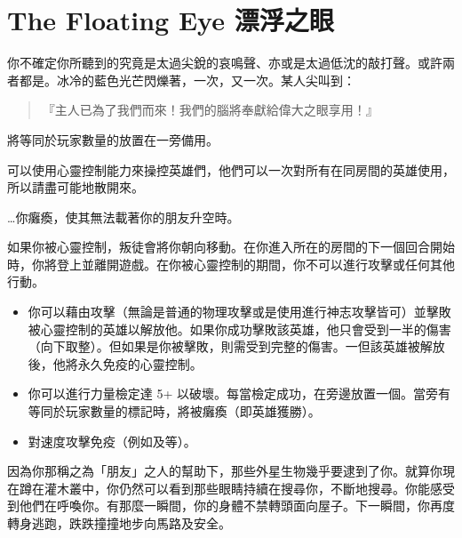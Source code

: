 
\chapter{The Floating Eye 漂浮之眼}

\begin{HauntStory}
  你不確定你所聽到的究竟是太過尖銳的哀鳴聲、亦或是太過低沈的敲打聲。或許兩者都是。冰冷的藍色光芒閃爍著，一次，又一次。某人尖叫到：
  \begin{quote}
    『主人已為了我們而來！我們的腦將奉獻給偉大之眼享用！』
  \end{quote}
\end{HauntStory}

將等同於玩家數量的放置在一旁備用。


可以使用心靈控制能力來操控英雄們，他們可以一次對所有在同房間的英雄使用，所以請盡可能地散開來。

…你癱瘓，使其無法載著你的朋友升空時。

如果你被心靈控制，叛徒會將你朝向移動。在你進入所在的房間的下一個回合開始時，你將登上並離開遊戲。在你被心靈控制的期間，你不可以進行攻擊或任何其他行動。

\vfill\null\pagebreak

\vspace*{-1em}
\begin{itemize}
  \item 你可以藉由攻擊（無論是普通的物理攻擊或是使用進行神志攻擊皆可）並擊敗被心靈控制的英雄以解放他。如果你成功擊敗該英雄，他只會受到一半的傷害（向下取整）。但如果是你被擊敗，則需受到完整的傷害。一但該英雄被解放後，他將永久免疫的心靈控制。
  \item 你可以進行力量檢定達 5+ 以破壞。每當檢定成功，在旁邊放置一個。當旁有等同於玩家數量的標記時，將被癱瘓（即英雄獲勝）。
  \item {}對速度攻擊免疫（例如及等）。
\end{itemize}

\begin{HauntStory}
  因為你那稱之為「朋友」之人的幫助下，那些外星生物幾乎要逮到了你。就算你現在蹲在灌木叢中，你仍然可以看到那些眼睛持續在搜尋你，不斷地搜尋。你能感受到他們在呼喚你。有那麼一瞬間，你的身體不禁轉頭面向屋子。下一瞬間，你再度轉身逃跑，跌跌撞撞地步向馬路及安全。
\end{HauntStory}
